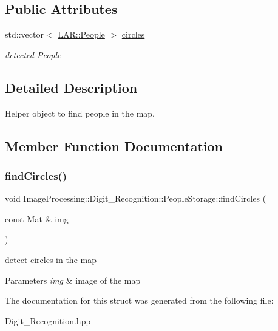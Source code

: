 \subsection*{Public Attributes}
\begin{DoxyCompactItemize}
\item 
\mbox{\label{struct_image_processing_1_1_digit___recognition_1_1_people_storage_ab81d06c5ea8024b52e4f15d9e7637d32}} 
std\+::vector$<$ \mbox{\hyperlink{class_l_a_r_1_1_people}{L\+A\+R\+::\+People}} $>$ \mbox{\hyperlink{struct_image_processing_1_1_digit___recognition_1_1_people_storage_ab81d06c5ea8024b52e4f15d9e7637d32}{circles}}
\begin{DoxyCompactList}\small\item\em detected People \end{DoxyCompactList}\end{DoxyCompactItemize}


\subsection{Detailed Description}
Helper object to find people in the map. 

\subsection{Member Function Documentation}
\mbox{\label{struct_image_processing_1_1_digit___recognition_1_1_people_storage_abf497a9ec4f06a14df057e6b94066ed2}} 
\subsubsection{\texorpdfstring{find\+Circles()}{findCircles()}}
{\footnotesize\ttfamily void Image\+Processing\+::\+Digit\+\_\+\+Recognition\+::\+People\+Storage\+::find\+Circles (\begin{DoxyParamCaption}\item[{const Mat \&}]{img }\end{DoxyParamCaption})\hspace{0.3cm}{\ttfamily [inline]}}

detect circles in the map 
\begin{DoxyParams}{Parameters}
{\em img} & image of the map \\
\hline
\end{DoxyParams}


The documentation for this struct was generated from the following file\+:\begin{DoxyCompactItemize}
\item 
Digit\+\_\+\+Recognition.\+hpp\end{DoxyCompactItemize}
